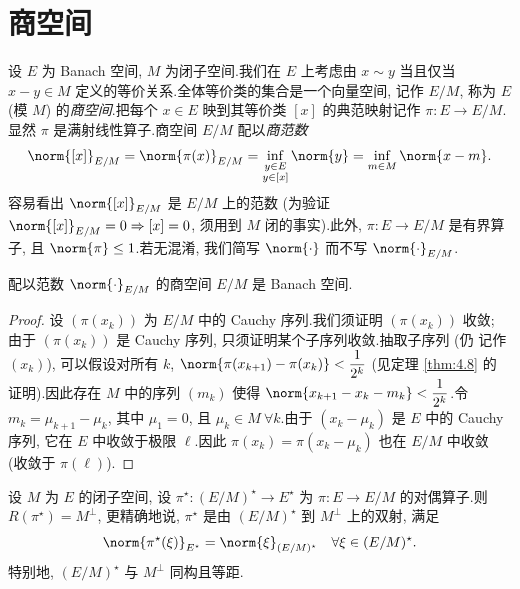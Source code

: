 \section{商空间}
\label{sec:11.2}

设 $E$ 为 Banach 空间, $M$ 为闭子空间.我们在 $E$ 上考虑由 $x\sim y$
当且仅当 $x-y\in M$ 定义的等价关系.全体等价类的集合是一个向量空间, 记作
$E/M$, 
称为 $E$ (模 $M$) 的\emph{商空间}.把每个 $x\in E$ 映到其等价类
$[x]$ 的典范映射记作 $\pi:E\to E/M$.显然 $\pi$ 是满射线性算子.商空间
$E/M$ 
配以\emph{商范数}
\begin{equation*}
\norm{[x]}_{E/M}=\norm{\pi(x)}_{E/M}
=\inf_{\substack{y\in E\\ y\in[x]}}\norm{y}
=\inf_{m\in M}\norm{x-m}.
\end{equation*}
容易看出 $\norm{[x]}_{E/M}$ 是 $E/M$ 上的范数 (为验证
$\norm{[x]}_{E/M}=0\Rightarrow[x]=0$, 须用到 $M$ 闭的事实).此外,
$\pi:E\to E/M$ 是有界算子, 且 $\norm{\pi}\le1$.若无混淆, 我们简写
$\norm{\cdot}$ 而不写 $\norm{\cdot}_{E/M}$.

\begin{proposition}
\label{prop:11.8}
配以范数 $\norm{\cdot}_{E/M}$ 的商空间 $E/M$ 是 Banach 空间.
\end{proposition}

\begin{proof}
设 $(\pi(x_k))$ 为 $E/M$ 中的 Cauchy 序列.我们须证明 $(\pi(x_k))$ 收敛;
由于 $(\pi(x_k))$ 是 Cauchy 序列, 只须证明某个子序列收敛.抽取子序列 (仍
记作 $(x_k)$), 可以假设对所有 $k$,
$\norm{\pi(x_{k+1})-\pi(x_k)}<\dfrac{1}{2^k}$ (见定理  \ref{thm:4.8} 的
证明).因此存在 $M$ 中的序列 $(m_k)$ 使得
$\norm{x_{k+1}-x_k-m_k}<\dfrac{1}{2^k}$.令 $m_k=\mu_{k+1}-\mu_k$, 其中
$\mu_1=0$, 且 $\mu_k\in M\ \forall k$.由于 $(x_k-\mu_k)$ 是 $E$ 中的
Cauchy 序列, 它在 $E$ 中收敛于极限 $\ell$.因此
$\pi(x_k)=\pi(x_k-\mu_k)$ 也在 $E/M$ 中收敛 (收敛于 $\pi(\ell)$).
\end{proof}

\begin{proposition}
\label{prop:11.9}
设 $M$ 为 $E$ 的闭子空间, 设 $\pi^\star:(E/M)^\star\to E^\star$ 为
$\pi:E\to E/M$ 的对偶算子.则 $R(\pi^\star)=M^\perp$, 更精确地说,
$\pi^\star$ 是由 $(E/M)^\star$ 到 $M^\perp$ 上的双射, 满足
\begin{equation*}
\norm{\pi^\star(\xi)}_{E^\star}=\norm{\xi}_{(E/M)^\star}
\quad\forall\xi\in(E/M)^\star.
\end{equation*}
特别地, $(E/M)^\star$ 与 $M^\perp$ 同构且等距.
\end{proposition}

